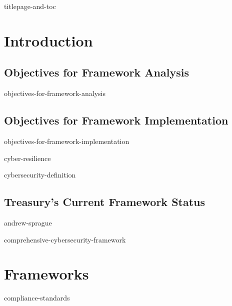 \documentclass[12pt]{article}
\begin{document}
\setlength\parindent{15pt}

                    {titlepage-and-toc}

\pagestyle{fancy}
\fancyhf{}
\fancyhead[R]{\thepage}

     \section{Introduction}

               \subsection{Objectives for Framework Analysis}

                                        {objectives-for-framework-analysis}

               \subsection{Objectives for Framework Implementation}

                                        {objectives-for-framework-implementation}

                                        {cyber-resilience}
                                        
\cleardoublepage

                                        {cybersecurity-definition}
                                       
               \subsection{Treasury's Current Framework Status}
     
                                        {andrew-sprague}

                                        {comprehensive-cybersecurity-framework}

\cleardoublepage

      \section{Frameworks}
      
               
                {compliance-standards}
                
\end{document}
